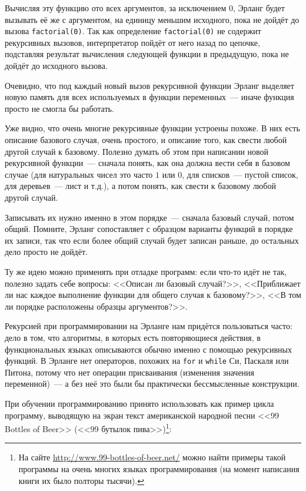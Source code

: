 \documentclass[
  paper=a4,
  fontsize=14pt,
  openany,
  appendixprefix=true
]{scrbook}
\begin{document}
Вычисляя эту функцию ото всех аргументов, за исключением $0$, Эрланг будет вызывать её же с аргументом, на единицу меньшим исходного, пока не дойдёт до вызова \lstinline{factorial(0)}. Так как определение \lstinline{factorial(0)} не содержит рекурсивных вызовов, интерпретатор пойдёт от него назад по цепочке, подставляя результат вычисления следующей функции в предыдущую, пока не дойдёт до исходного вызова.

Очевидно, что под каждый новый вызов рекурсивной функции Эрланг выделяет новую память для всех используемых в функции переменных~--- иначе функция просто не смогла бы работать.

Уже видно, что очень многие рекурсивные функции устроены похоже. В них есть описание базового случая, очень простого, и описание того, как свести любой другой случай к базовому. Полезно думать об этом при написании новой рекурсивной функции~--- сначала понять, как она должна вести себя в базовом случае (для натуральных чисел это часто $1$ или $0$, для списков~--- пустой список, для деревьев~--- лист и т.д.), а потом понять, как свести к базовому любой другой случай.

Записывать их нужно именно в этом порядке~--- сначала базовый случай, потом общий. Помните, Эрланг сопоставляет с образцом варианты функций в порядке их записи, так что если более общий случай будет записан раньше, до остальных дело просто не дойдёт.


Ту же идею можно применять при отладке программ: если что-то идёт не так, полезно задать себе вопросы: <<Описан ли базовый случай?>>, <<Приближает ли нас каждое выполнение функции для общего случая к базовому?>>, <<В том ли порядке расположены образцы аргументов?>>.

\label{noLoops}
Рекурсией при программировании на Эрланге нам придётся пользоваться часто: дело в том, что алгоритмы, в которых есть повторяющиеся действия, в функциональных языках описываются обычно именно с помощью рекурсивных функций. В Эрланге нет операторов, похожих на \lstinline{for} и \lstinline{while} Си, Паскаля или Питона, потому что нет операции присваивания (изменения значения переменной)~--- а без неё это были бы практически бессмысленные конструкции.

При обучении программированию принято использовать как пример цикла программу, выводящую на экран текст американской народной песни <<99 Bottles of Beer>> (<<99 бутылок пива>>)\footnote{На сайте \url{http://www.99-bottles-of-beer.net/} можно найти примеры такой программы на очень многих языках программирования (на момент написания книги их было полторы тысячи).}:
\end{document}
